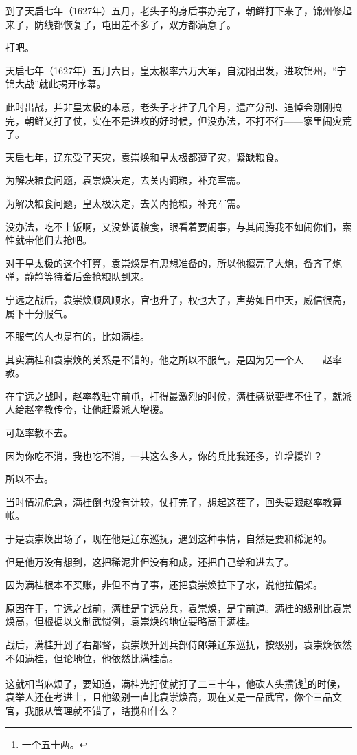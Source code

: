 \begin{multicols}{\theparacolNo}
		到了天启七年（1627年）五月，老头子的身后事办完了，朝鲜打下来了，锦州修起来了，防线都恢复了，屯田差不多了，双方都满意了。

		打吧。

		天启七年（1627年）五月六日，皇太极率六万大军，自沈阳出发，进攻锦州，“宁锦大战”就此揭开序幕。

		此时出战，并非皇太极的本意，老头子才挂了几个月，遗产分割、追悼会刚刚搞完，朝鲜又打了仗，实在不是进攻的好时候，但没办法，不打不行——家里闹灾荒了。

		天启七年，辽东受了天灾，袁崇焕和皇太极都遭了灾，紧缺粮食。

		为解决粮食问题，袁崇焕决定，去关内调粮，补充军需。

		为解决粮食问题，皇太极决定，去关内抢粮，补充军需。

		没办法，吃不上饭啊，又没处调粮食，眼看着要闹事，与其闹腾我不如闹你们，索性就带他们去抢吧。

		对于皇太极的这个打算，袁崇焕是有思想准备的，所以他擦亮了大炮，备齐了炮弹，静静等待着后金抢粮队到来。

		宁远之战后，袁崇焕顺风顺水，官也升了，权也大了，声势如日中天，威信很高，属下十分服气。

		不服气的人也是有的，比如满桂。

		其实满桂和袁崇焕的关系是不错的，他之所以不服气，是因为另一个人——赵率教。

		在宁远之战时，赵率教驻守前屯，打得最激烈的时候，满桂感觉要撑不住了，就派人给赵率教传令，让他赶紧派人增援。

		可赵率教不去。

		因为你吃不消，我也吃不消，一共这么多人，你的兵比我还多，谁增援谁？

		所以不去。

		当时情况危急，满桂倒也没有计较，仗打完了，想起这茬了，回头要跟赵率教算帐。

		于是袁崇焕出场了，现在他是辽东巡抚，遇到这种事情，自然是要和稀泥的。

		但是他万没有想到，这把稀泥非但没有和成，还把自己给和进去了。

		因为满桂根本不买账，非但不肯了事，还把袁崇焕拉下了水，说他拉偏架。

		原因在于，宁远之战前，满桂是宁远总兵，袁崇焕，是宁前道。满桂的级别比袁崇焕高，但根据以文制武惯例，袁崇焕的地位要略高于满桂。

		战后，满桂升到了右都督，袁崇焕升到兵部侍郎兼辽东巡抚，按级别，袁崇焕依然不如满桂，但论地位，他依然比满桂高。

		这就相当麻烦了，要知道，满桂光打仗就打了二三十年，他砍人头攒钱\footnote{一个五十两。}的时候，袁举人还在考进士，且他级别一直比袁崇焕高，现在又是一品武官，你个三品文官，我服从管理就不错了，瞎搅和什么？


\end{multicols}

